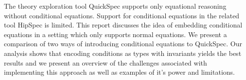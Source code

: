 The theory exploration tool QuickSpec
supports only equational reasoning without
conditional equations. Support for conditional
equations in the related tool HipSpec is limited.
This report discusses the idea of embedding conditional
equations in a setting which only supports normal equations.
We present a comparison of two ways of introducing
conditional equations to QuickSpec.
Our analysis shows that encoding conditions as types with invariants 
yields the best results and we present an overview of
the challenges associated with implementing
this approach as well as examples
of it's power and limitations.

